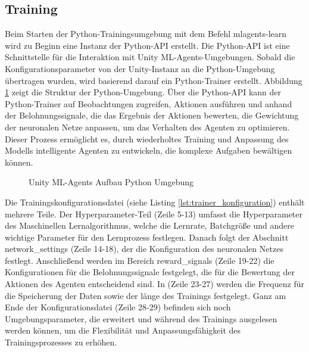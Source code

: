 \subsection{Training}
Beim Starten der Python-Trainingsumgebung mit dem Befehl \grqq{}mlagents-learn\grqq{} wird zu Beginn eine Instanz der Python-API erstellt. Die Python-API ist eine Schnittstelle für die Interaktion mit Unity ML-Agents-Umgebungen. Sobald die Konfigurationsparameter von der Unity-Instanz an die Python-Umgebung übertragen wurden, wird basierend darauf ein Python-Trainer erstellt. Abbildung \ref{fig:mlagents_aufbau_python} zeigt die Struktur der Python-Umgebung. Über die Python-API kann der Python-Trainer auf Beobachtungen zugreifen, Aktionen ausführen und anhand der Belohnungssignale, die das Ergebnis der Aktionen bewerten, die Gewichtung der neuronalen Netze anpassen, um das Verhalten des Agenten zu optimieren. Dieser Prozess ermöglicht es, durch wiederholtes Training und Anpassung des Modells intelligente Agenten zu entwickeln, die komplexe Aufgaben bewältigen können.

\begin{figure}[H]
  \centering  
  \caption{Unity ML-Agents Aufbau Python Umgebung}
  \label{fig:mlagents_aufbau_python}
\end{figure}

Die Trainingskonfigurationsdatei (siehe Listing \ref{lst:trainer_konfiguration}) enthält mehrere Teile. Der Hyperparameter-Teil (Zeile 5-13) umfasst die Hyperparameter des Maschinellen Lernalgorithmus, welche die Lernrate, Batchgröße und andere wichtige Parameter für den Lernprozess festlegen. Danach folgt der Abschnitt network\_settings (Zeile 14-18), der die Konfiguration des neuronalen Netzes festlegt. Anschließend werden im Bereich reward\_signals (Zeile 19-22) die Konfigurationen für die Belohnungssignale festgelegt, die für die Bewertung der Aktionen des Agenten entscheidend sind. In (Zeile 23-27) werden die Frequenz für die Speicherung der Daten sowie der länge des Trainings festgelegt. Ganz am Ende der Konfigurationsdatei (Zeile 28-29) befinden sich noch Umgebungsparameter, die erweitert und während des Trainings ausgelesen werden können, um die Flexibilität und Anpassungsfähigkeit des Trainingsprozesses zu erhöhen.

